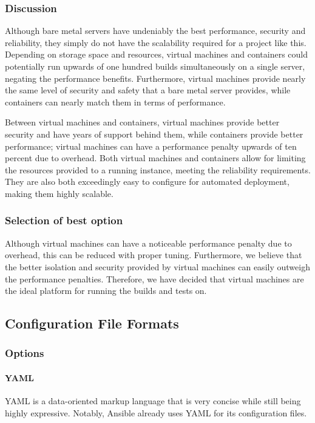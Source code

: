 \documentclass[10pt,letterpaper,onecolumn,draftclsnofoot]{IEEEtran}
\begin{document}
\subsubsection{Discussion}
Although bare metal servers have undeniably the best performance, security and reliability, they simply do not have the scalability required for a project like this. Depending on storage space and resources, virtual machines and containers could potentially run upwards of one hundred builds simultaneously on a single server, negating the performance benefits. Furthermore, virtual machines provide nearly the same level of security and safety that a bare metal server provides, while containers can nearly match them in terms of performance.

Between virtual machines and containers, virtual machines provide better security and have years of support behind them, while containers provide better performance; virtual machines can have a performance penalty upwards of ten percent due to overhead.\cite{RC25482} Both virtual machines and containers allow for limiting the resources provided to a running instance, meeting the reliability requirements. They are also both exceedingly easy to configure for automated deployment, making them highly scalable.
\subsubsection{Selection of best option}
Although virtual machines can have a noticeable performance penalty due to overhead, this can be reduced with proper tuning. Furthermore, we believe that the better isolation and security provided by virtual machines can easily outweigh the performance penalties. Therefore, we have decided that virtual machines are the ideal platform for running the builds and tests on.

\subsection{Configuration File Formats}
\subsubsection{Options}
\paragraph{YAML}
YAML is a data-oriented markup language that is very concise while still being highly expressive. Notably, Ansible already uses YAML for its configuration files.
\end{document}
